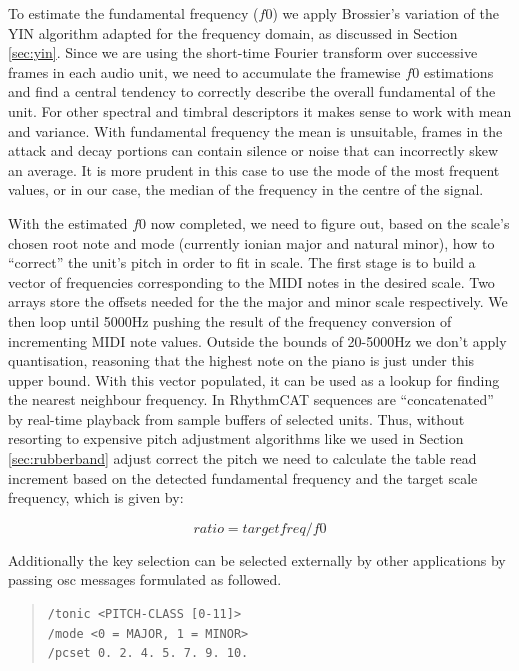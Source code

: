 To estimate the fundamental frequency ($f0$) we apply Brossier's variation of the YIN algorithm adapted for the frequency domain, as discussed in Section \ref{sec:yin}. Since we are using the short-time Fourier transform over successive frames in each audio unit, we need to accumulate the framewise $f0$ estimations and find a central tendency to correctly describe the overall fundamental of the unit. For other spectral and timbral descriptors it makes sense to work with mean and variance. With fundamental frequency the mean is unsuitable, frames in the attack and decay portions can contain silence or noise that can incorrectly skew an average. It is more prudent in this case to use the mode of the most frequent values, or in our case, the median of the frequency in the centre of the signal.

With the estimated $f0$ now completed, we need to figure out, based on the scale’s chosen root note and mode (currently ionian major and natural minor), how to “correct” the unit’s pitch in order to fit in scale. The first stage is to build a vector of frequencies corresponding to the MIDI notes in the desired scale. Two arrays store the offsets needed for the the major and minor scale respectively. We then loop until 5000Hz pushing the result of the frequency conversion of incrementing MIDI note values. Outside the bounds of 20-5000Hz we don’t apply quantisation, reasoning that the highest note on the piano is just under this upper bound. With this vector populated, it can be used as a lookup for finding the nearest neighbour frequency. In RhythmCAT sequences are “concatenated” by real-time playback from sample buffers of selected units. Thus, without resorting to expensive pitch adjustment algorithms like we used in Section \ref{sec:rubberband} adjust correct the pitch we need to calculate the table read increment based on the detected fundamental frequency and the target scale frequency, which is given by:

  \begin{equation}
	\label{eq:mel}	
	ratio = target freq / f0
	\end{equation}

Additionally the key selection can be selected externally by other applications by passing \acrshort{osc} messages formulated as followed.

\begin{quote}

\footnotesize
\begin{verbatim}
/tonic <PITCH-CLASS [0-11]>
/mode <0 = MAJOR, 1 = MINOR>
/pcset 0. 2. 4. 5. 7. 9. 10.
\end{verbatim}

\end{quote}

